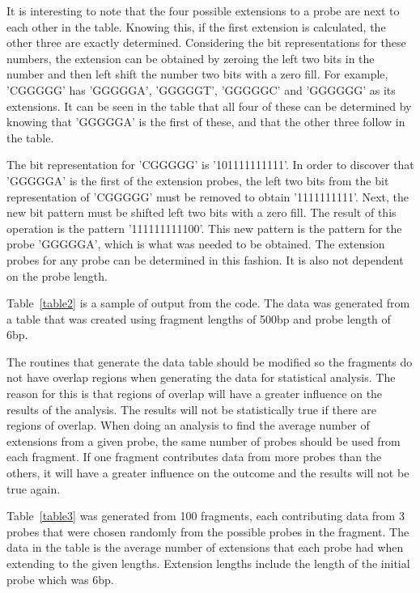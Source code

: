 It is interesting to note that the four possible extensions to a probe are
next to each other in the table.  Knowing this, if the first extension is
calculated, the other three are exactly determined.  Considering the bit
representations for these numbers, the extension can be obtained by zeroing
the left two bits in the number and then left shift the number two bits
with a zero fill.  For example, 'CGGGGG' has 'GGGGGA', 'GGGGGT', 'GGGGGC'
and 'GGGGGG' as its extensions.  It can be seen in the table that all four
of these can be determined by knowing that 'GGGGGA' is the first of these,
and that the other three follow in the table.

The bit representation for 'CGGGGG' is '101111111111'.  In order to
discover that 'GGGGGA' is the first of the extension probes, the left two
bits from the bit representation of 'CGGGGG' must be removed to obtain
'1111111111'.  Next, the new bit pattern must be shifted left two bits with
a zero fill.  The result of this operation is the pattern '111111111100'.
This new pattern is the pattern for the probe 'GGGGGA', which is what was
needed to be obtained.  The extension probes for any probe can be
determined in this fashion.  It is also not dependent on the probe length.

Table~\ref{table2} is a sample of output from the code.  The data was generated from a
table that was created using fragment lengths of 500bp and probe length of
6bp.



The routines that generate the data table should be modified so the
fragments do not have overlap regions when generating the data for
statistical analysis.  The reason for this is that regions of overlap will
have a greater influence on the results of the analysis.  The results will
not be statistically true if there are regions of overlap.  When doing an
analysis to find the average number of extensions from a given probe, the
same number of probes should be used from each fragment.  If one fragment
contributes data from more probes than the others, it will have a greater
influence on the outcome and the results will not be true again.

Table~\ref{table3} was generated from 100 fragments, each contributing
data from 3 probes that were chosen randomly from the possible probes in
the fragment.  The data in the table is the average number of extensions
that each probe had when extending to the given lengths.  Extension lengths
include the length of the initial probe which was 6bp.

